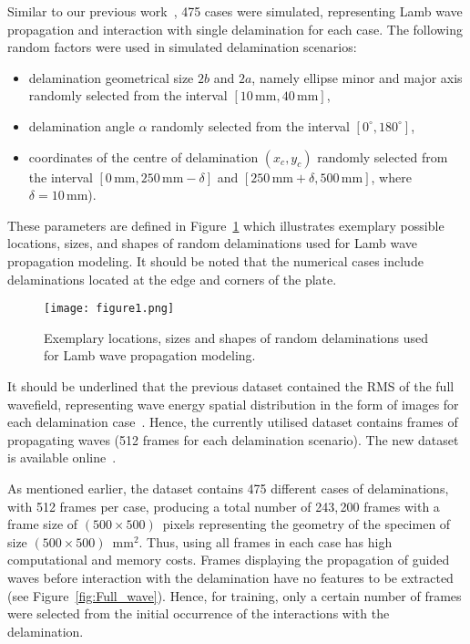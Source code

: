 Similar to our previous work~\cite{Ijjeh2021}, 475 cases were simulated, representing Lamb wave propagation and interaction with single delamination for each case. 
The following random factors were used in simulated delamination scenarios:
\begin{itemize}
	\item delamination geometrical size	\(2b\) and \(2a\), namely ellipse minor and major axis randomly selected from the interval \(\left[10 \, \textrm{mm}, 40\, \textrm{mm}\right]\),
	\item delamination angle \(\alpha\) randomly selected from the interval \( \left[ 0^{\circ}, 180^{\circ} \right]\),
	\item coordinates of the centre of delamination \((x_c,y_c)\) randomly selected from the interval \(\left[0\, \textrm{mm}, 250\, \textrm{mm} -\delta \right]\) and \( \left[250\, \textrm{mm}+\delta, 500\, \textrm{mm} \right] \), where \(\delta = 10\, \textrm{mm}\)).
\end{itemize}
These parameters are defined in Figure~\ref{fig:random_delaminations} which 
illustrates exemplary possible locations, sizes, and shapes of random 
delaminations used for Lamb wave propagation modeling.
It should be noted that the numerical cases include delaminations located at 
the edge and corners of the plate.
\begin{figure}[!h]
	\centering
	\texttt{[image: figure1.png]}
	\caption{Exemplary locations, sizes and shapes of random delaminations used 
for Lamb wave propagation modeling.}
	\label{fig:random_delaminations}
\end{figure}

It should be underlined that the previous dataset contained the RMS of the full wavefield, representing wave energy spatial distribution in the form of images for each delamination case~\cite{Kudela2020d}.
Hence, the currently utilised dataset contains frames of propagating waves (512 frames for each delamination scenario).
The new dataset is available online~\cite{kudela_pawel_2021_5414555}.

As mentioned earlier, the dataset contains 475 different cases of delaminations, with 512 frames per case, producing a total number of 243,\,200 frames with a frame size of \((500\times500)\)~pixels representing the geometry of the specimen of size \((500\times500)\)~mm\(^{2}\).
Thus, using all frames in each case has high computational and memory costs.
Frames displaying the propagation of guided waves before interaction with the 
delamination have no features to be extracted (see Figure~\ref{fig:Full_wave}).
Hence, for training, only a certain number of frames were selected from the initial occurrence of the interactions with the delamination.

